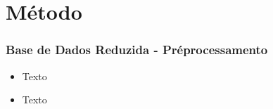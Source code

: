 \section{Método}
\begin{frame}
\frametitle{Base de Dados Reduzida - Préprocessamento}
\justifying

\begin{itemize}
    \item  Texto
    \vspace{0.2cm}

    \item Texto
    \vspace{0.2cm}

\end{itemize}    
\end{frame}